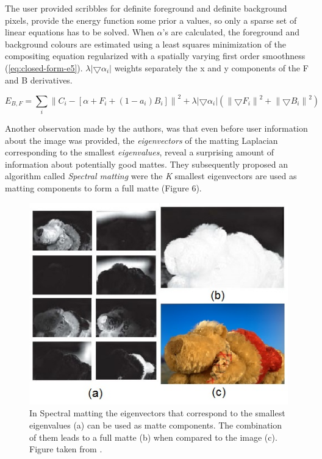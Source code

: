The user provided scribbles for definite foreground and definite background pixels, provide the energy function some prior a values, so only a sparse set of linear equations has to be solved. When $\alpha$’s are calculated, the foreground and background colours are estimated using a least squares minimization of the compositing equation regularized with a spatially varying first order smoothness (\ref{eq:closed-form-e5}). $\lambda\left |\bigtriangledown \alpha_{i}  \right |$ weights separately the x and y components of the F and B derivatives.


\begin{equation} \label{eq:closed-form-e5}
E_{B,F}=\sum _{i}\left \| C_{i}-[\alpha+F_{i}+(1-a_{i})B_{i}] \right \|^{2}+\lambda\left |\bigtriangledown \alpha_{i}  \right |(\left \| \bigtriangledown F_i \right \|^{2}+\left \| \bigtriangledown B_{i} \right \|^2)
\end{equation}

Another observation made by the authors, was that even before user information about the image was provided, the \textit{eigenvectors} of the matting Laplacian corresponding to the smallest \textit{eigenvalues}, reveal a surprising amount of information about potentially good mattes. They subsequently proposed an algorithm called \textit{Spectral matting} \cite{spectral} were the \textit{K} smallest eigenvectors are used as matting components to form a full matte (Figure 6).

\begin{figure}[t!]
\centering
\includegraphics[width=0.8\columnwidth]{Chapter2/2/closed_form_figure_2.jpg}
\caption[Eigenvector images.]{In Spectral matting the eigenvectors that correspond to the smallest eigenvalues (a) can be used as matte components. The combination of them leads to a full matte (b) when compared to the image (c). Figure taken from \cite{spectral}.}
\label{fig:closed-form-f2}
\end{figure}

